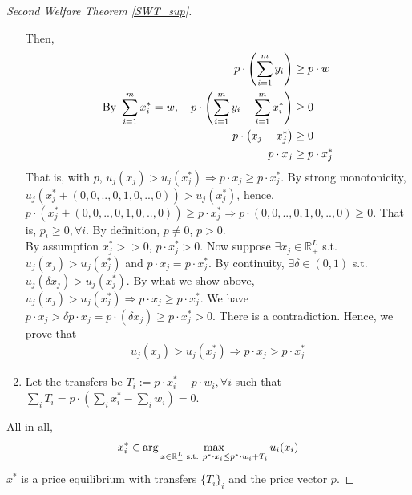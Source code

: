 \documentclass[11pt]{elegantbook}
\begin{document}
\begin{proof}[Second Welfare Theorem \ref{SWT_sup}]
\begin{enumerate}[$\circ$]
            Then,
            \begin{equation}
                \begin{aligned}
                    p\cdot \left(\sum_{i=1}^m y_i\right)&\geq p\cdot w\\
                    \textnormal{By }\sum_{i=1}^m x_i^*=w,\quad p\cdot \left(\sum_{i=1}^m y_i-\sum_{i=1}^m x_i^*\right)&\geq 0\\
                    p\cdot \left(x_j-x_j^*\right)&\geq 0\\
                    p\cdot x_j&\geq p\cdot x_j^*
                \end{aligned}
                \nonumber
            \end{equation}
            That is, with $p$, $u_j(x_j)>u_j(x_j^*) \Rightarrow p\cdot x_j\geq p\cdot x_j^*$.
            \subitem
            By strong monotonicity, $u_j(x_j^*+(0,0,..,0,1,0,..,0))>u_j(x_j^*)$, hence, $p\cdot (x_j^*+(0,0,..,0,1,0,..,0))\geq p\cdot x_j^* \Rightarrow p\cdot (0,0,..,0,1,0,..,0)\geq 0$. That is, $p_i\geq 0,\forall i$. By definition, $p\neq 0$, $p>0$.\\
            By assumption $x_j^*>>0$, $p\cdot x_j^*>0$. Now suppose $\exists x_j\in \mathbb{R}_+^L$ s.t. $u_j(x_j)>u_j(x_j^*)$ and $p\cdot x_j=p\cdot x_j^*$. By continuity, $\exists\delta\in (0,1)$ s.t. $u_j(\delta x_j)>u_j(x_j^*)$. By what we show above, $u_j(x_j)>u_j(x_j^*) \Rightarrow p\cdot x_j\geq p\cdot x_j^*$. We have $p\cdot x_j>\delta p\cdot x_j=p\cdot (\delta x_j)\geq p\cdot x_j^*>0$. There is a contradiction. Hence, we prove that
            \begin{equation}
                \begin{aligned}
                    u_j(x_j)>u_j(x_j^*) \Rightarrow p\cdot x_j> p\cdot x_j^*
                \end{aligned}
                \nonumber
            \end{equation}
        \item Let the transfers be $T_i:=p\cdot x_i^*-p\cdot w_i, \forall i$ such that $\sum_{i}T_i=p\cdot (\sum_{i}x_i^*-\sum_{i}w_i)=0$.
    \end{enumerate}
    All in all,
    \begin{equation}
        \begin{aligned}
            x_i^*\in \arg\max_{x\in \mathbb{R}^L_+ \textnormal{ s.t. } p^*\cdot x_i\leq p^*\cdot w_i + T_i}u_i(x_i)
        \end{aligned}
        \nonumber
    \end{equation}
    $x^*$ is a price equilibrium with transfers $\{T_i\}_i$ and the price vector $p$.
\end{proof}
\end{document}

